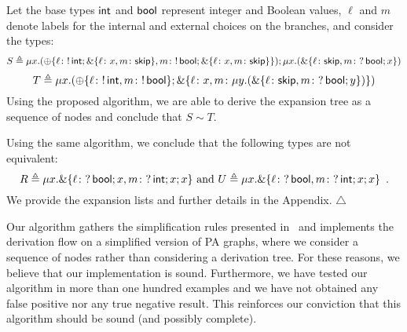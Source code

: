 \begin{example}
\label{ex:example1}
	Let the base types $\mathsf{int}$ and $\mathsf{bool}$ represent integer and Boolean values, $\ell$ and $m$ denote labels for the internal and external choices on the branches, and consider the types:
	\[
	S\triangleq \mu x. (\oplus\{\ell\colon !\,\mathsf{int}; \&\{\ell\colon x, m\colon \mathsf{skip} \} , m\colon !\, \mathsf{bool}; \&\{\ell\colon x, m\colon \mathsf{skip} \} \}); \mu x. (\&\{\ell\colon\mathsf{skip}, m\colon ?\,\mathsf{bool}; x \})
	\]
	\[
	T\triangleq \mu x. (\oplus\{\ell\colon !\,\mathsf{int} , m\colon !\, \mathsf{bool}\}; \&\{\ell\colon x, m\colon \mu y. (\&\{\ell\colon\mathsf{skip}, m\colon ?\,\mathsf{bool}; y \})\})
	\]
	Using the proposed algorithm, we are able to derive the expansion tree as a sequence of nodes and conclude that $S\sim T$.\smallskip
	
	Using the same algorithm, we conclude that the following types are not equivalent:
	\[ R \triangleq \mu x.\&\{\ell\colon ?\,\mathsf{bool};x, m\colon ?\,\mathsf{int};x;x \} \text{ and }  U \triangleq \mu x.\&\{\ell\colon ?\,\mathsf{bool}, m\colon ?\,\mathsf{int};x;x\} \enspace .\]
	We provide the expansion lists and further details in the Appendix. \hfill$\triangle$
\end{example}




Our algorithm gathers the simplification rules presented
in~\cite{janvcar1999techniques} and implements the derivation flow on
a simplified version of PA graphs, where we consider a sequence of
nodes rather than considering a derivation tree. For these reasons, we
believe that our implementation is sound. Furthermore, we have tested
our algorithm in more than one hundred examples and we have not
obtained any false positive nor any true negative result. This
reinforces our conviction that this algorithm should be sound (and
possibly complete).

